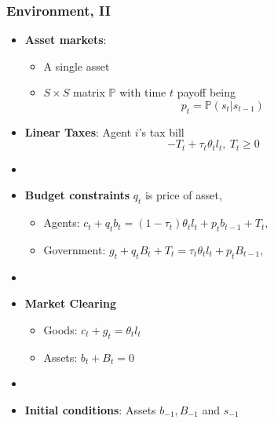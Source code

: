 \documentclass{beamer}
\begin{document}
\begin{frame}
 \frametitle{Environment, II}
 \begin{itemize}
\item \textbf{Asset markets}:
\begin{itemize}
 \item A single asset
\item $S \times S$ matrix $\mathbb{P}$ with time $t$ payoff being
\[p_t=\mathbb{P}(s_{t}|s_{t-1})\]
\end{itemize}



  \item \textbf{Linear Taxes}: Agent $i$'s tax bill
\[- T_t + \tau_t \theta_{t}l_{t},  \ T_t \geq 0 \]

\item[]
  \item \textbf{Budget constraints} $q_t$ is price of  asset,

  \begin{itemize}
   \item Agents: $ c_{t}+q_tb_{t}=\left( 1-\tau _{t}\right) \theta _{t}l_{t}+p_{t}b_{t-1}+T_{t},$ %
  \item Government: $g_{t}+q_tB_{t}+T_t=\tau _{t}\theta_{t}l_{t}+p_{t}B_{t-1}, $%
  \end{itemize}

\item[]
  \item \textbf{Market Clearing}
  \begin{itemize}
   \item Goods: $c_{t}+g_t = \theta _{t} l_{t}$

   \item Assets: $b_{t}+B_{t}=0$
\end{itemize}
  \item[]

\item \textbf{Initial conditions}: Assets $b_{-1}, B_{-1}$ and  $s_{-1}$
\end{itemize}

\end{frame}
\end{document}
